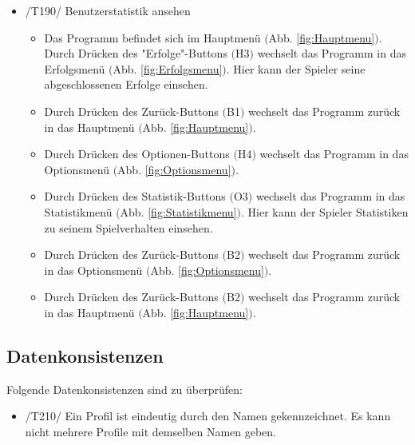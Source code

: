 \begin{itemize}
\item /T190/ Benutzerstatistik ansehen
\begin{itemize}
\item Das Programm befindet sich im Hauptmenü $($Abb. \ref{fig:Hauptmenu}$)$. Durch Drücken des "Erfolge"-Buttons $($H3$)$ wechselt das Programm in das Erfolgsmenü $($Abb. \ref{fig:Erfolgsmenu}$)$. Hier kann der Spieler seine abgeschlossenen Erfolge einsehen.
\item Durch Drücken des Zurück-Buttons $($B1$)$ wechselt das Programm zurück in das Hauptmenü $($Abb. \ref{fig:Hauptmenu}$)$.
\item Durch Drücken des Optionen-Buttons $($H4$)$ wechselt das Programm in das Optionsmenü $($Abb. \ref{fig:Optionsmenu}$)$.
\item Durch Drücken des Statistik-Buttons $($O3$)$ wechselt das Programm in das Statistikmenü $($Abb. \ref{fig:Statistikmenu}$)$. Hier kann der Spieler Statistiken zu seinem Spielverhalten einsehen.
\item Durch Drücken des Zurück-Buttons $($B2$)$ wechselt das Programm zurück in das Optionsmenü $($Abb. \ref{fig:Optionsmenu}$)$.
\item Durch Drücken des Zurück-Buttons $($B2$)$ wechselt das Programm zurück in das Hauptmenü $($Abb. \ref{fig:Hauptmenu}$)$.
\end{itemize}

\end{itemize}

\subsection{Datenkonsistenzen}
Folgende Datenkonsistenzen sind zu überprüfen:

\begin{itemize}
\item /T210/ Ein Profil ist eindeutig durch den Namen gekennzeichnet. Es kann nicht mehrere Profile mit demselben Namen geben.
\end{itemize}
